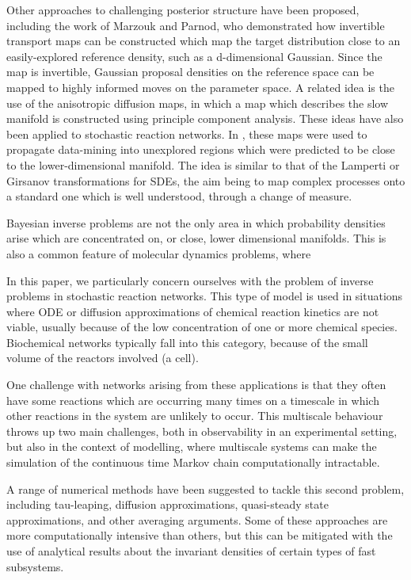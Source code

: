 \documentclass[final]{siamltex}
\begin{document}
Other approaches to challenging posterior structure have been
proposed, including the work of Marzouk and Parnod\cite{parno2014transport}, who
demonstrated how invertible transport maps can be constructed which
map the target distribution close to an easily-explored reference
density, such as a d-dimensional Gaussian. Since the map is
invertible, Gaussian proposal densities on the reference space can be
mapped to highly informed moves on the parameter space. A related idea
is the use of the anisotropic diffusion maps\cite{singer2008non}, in
which a map which describes the slow manifold is constructed using
principle component analysis. These ideas have also been applied to
stochastic reaction
networks\cite{singer2009detecting,dsilva2016data}. In
\cite{chiavazzo2017intrinsic}, these maps were used to propagate
data-mining into unexplored regions which were predicted to be close
to the lower-dimensional manifold. The idea is similar to that of the
Lamperti or Girsanov transformations for SDEs\cite{flandrin2003stationarity,gardiner2009stochastic},  the aim being to map complex
processes onto a standard one which is well understood, through a
change of measure.

Bayesian inverse problems are not the only area in which probability
densities arise which are concentrated on, or close, lower dimensional
manifolds. This is also a common feature of molecular dynamics
problems, where 

In this paper, we particularly concern ourselves with the problem of
inverse problems in stochastic reaction networks. This type of model
is used in situations where ODE or diffusion\cite{gillespie2000chemical}
approximations of chemical reaction kinetics are not viable, usually
because of the low concentration of one or more chemical
species\cite{gillespie1977exact}. Biochemical networks typically fall into
this category, because of the small volume of the reactors involved (a
cell).

One challenge with networks arising from these applications is that
they often have some reactions which are occurring many times on a
timescale in which other reactions in the system are unlikely to
occur. This multiscale behaviour throws up two main challenges, both
in observability in an experimental setting, but also in the context
of modelling, where multiscale systems can make the simulation of the
continuous time Markov chain computationally intractable.

A range of numerical methods have been suggested to tackle this second
problem, including tau-leaping\cite{rathinam2003stiffness,cao2006efficient}, diffusion approximations\cite{erban2006gene,cotter2011constrained,cotter2016error}, quasi-steady state
approximations\cite{weinan2007nested,cao2005slow}, and other averaging
arguments\cite{cotter2016constrained}. Some of these approaches are more
computationally intensive than others, but this can be mitigated with the
use of analytical results about the invariant densities of certain
types of fast subsystems\cite{jahnke2007solving,anderson2010product,anderson2016product}.
\end{document}
